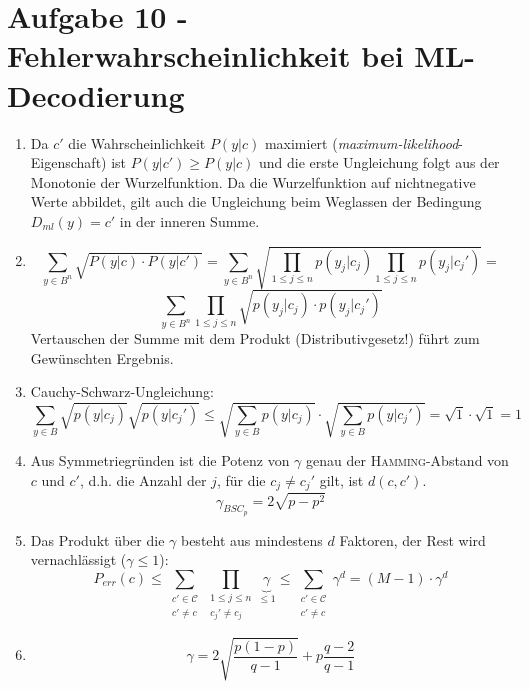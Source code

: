 \section*{Aufgabe 10 - Fehlerwahrscheinlichkeit bei ML-Decodierung}
\begin{enumerate}
	\item
	Da $c'$ die Wahrscheinlichkeit $P(y|c)$ maximiert
	(\textit{maximum-likelihood}-Eigenschaft) ist $P(y|c') \geq P(y|c)$ und
	die erste Ungleichung folgt aus der Monotonie der Wurzelfunktion.
	Da die Wurzelfunktion auf nichtnegative Werte abbildet, gilt auch die
	Ungleichung beim Weglassen der Bedingung $D_{ml}(y)=c'$ in der inneren
	Summe.
	\item
	\[ \sum_{y\in B^n}\sqrt{P(y|c)\cdot P(y|c')} = \sum_{y\in
	B^n}\sqrt{\prod_{1\leq j\leq n} p(y_j|c_j) \prod_{1\leq j\leq n}
	p(y_j|c_j')} = \]
	\[ \sum_{y\in B^n}\prod_{1\leq j\leq n}\sqrt{p(y_j|c_j)\cdot
	p(y_j|c_j')} \]
	Vertauschen der Summe mit dem Produkt (Distributivgesetz!) führt zum
	Gewünschten Ergebnis.
	\item
	Cauchy-Schwarz-Ungleichung:
	\[ \sum_{y\in B}\sqrt{p(y|c_j)}\sqrt{p(y|c_j')} \leq \sqrt{\sum_{y\in
	B}p(y|c_j)} \cdot \sqrt{\sum_{y\in B}p(y|c_j')} = \sqrt{1} \cdot
	\sqrt{1} = 1 \]
	\item
	Aus Symmetriegründen ist die Potenz von $\gamma$ genau der
	\textsc{Hamming}-Abstand von $c$ und $c'$, d.h. die Anzahl der $j$, für
	die $c_j \not= c_j'$ gilt, ist $d(c,c')$.
	\[ \gamma_{BSC_p} = 2\sqrt{p-p^2} \]
	\item
	Das Produkt über die $\gamma$ besteht aus mindestens $d$ Faktoren, der
	Rest wird vernachlässigt ($\gamma \leq 1$):
	\[ P_{err}(c) \leq
	\sum_{\substack{c'\in\mathcal{C}\\c'\not=c}}\prod_{\substack{1\leq
	j\leq n\\c_j'\not=c_j}}\underbrace{\gamma}_{\leq 1} \leq
	\sum_{\substack{c'\in\mathcal{C}\\c'\not=c}}\gamma^d = (M - 1)\cdot
	\gamma^d \]
	\item
	\[ \gamma = 2\sqrt{\frac{p(1-p)}{q-1}}+p\frac{q-2}{q-1} \]
\end{enumerate}
